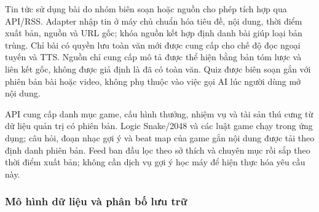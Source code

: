Tin tức sử dụng bài do nhóm biên soạn hoặc nguồn cho phép tích hợp qua API/RSS. Adapter nhập tin ở máy chủ chuẩn hóa tiêu đề, nội dung, thời điểm xuất bản, nguồn và URL gốc; khóa nguồn kết hợp định danh bài giúp loại bản trùng. Chỉ bài có quyền lưu toàn văn mới được cung cấp cho chế độ đọc ngoại tuyến và TTS. Nguồn chỉ cung cấp mô tả được thể hiện bằng bản tóm lược và liên kết gốc, không được giả định là đã có toàn văn. Quiz được biên soạn gắn với phiên bản bài hoặc video, không phụ thuộc vào việc gọi AI lúc người dùng mở nội dung.

API cung cấp danh mục game, cấu hình thưởng, nhiệm vụ và tài sản thú cưng từ dữ liệu quản trị có phiên bản. Logic Snake/2048 và các luật game chạy trong ứng dụng; câu hỏi, đoạn nhạc gợi ý và beat map của game gắn nội dung được tải theo định danh phiên bản. Feed ban đầu lọc theo sở thích và chuyên mục rồi sắp theo thời điểm xuất bản; không cần dịch vụ gợi ý học máy để hiện thực hóa yêu cầu này.

\subsubsection{Mô hình dữ liệu và phân bố lưu trữ}
\label{sec:data-model}

